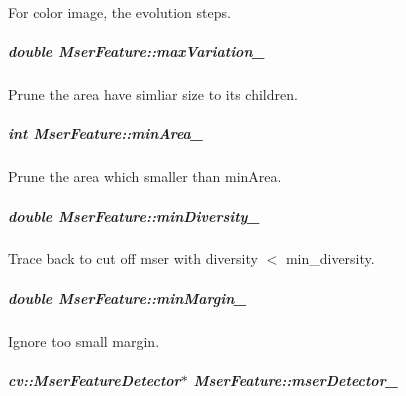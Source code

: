 For color image, the evolution steps. 

\hypertarget{group___feature_extractor_a9353f0657019b0177c8ce65c00d826f4}{
\subparagraph[{max\-Variation\-\_\-}]{\setlength{\rightskip}{0pt plus 5cm}double Mser\-Feature\-::max\-Variation\-\_\-\hspace{0.3cm}{\ttfamily [private]}}}\label{group___feature_extractor_a9353f0657019b0177c8ce65c00d826f4}


Prune the area have simliar size to its children. 

\hypertarget{group___feature_extractor_a556156bf90c6cff20f7451134dc5c9f3}{
\subparagraph[{min\-Area\-\_\-}]{\setlength{\rightskip}{0pt plus 5cm}int Mser\-Feature\-::min\-Area\-\_\-\hspace{0.3cm}{\ttfamily [private]}}}\label{group___feature_extractor_a556156bf90c6cff20f7451134dc5c9f3}


Prune the area which smaller than min\-Area. 

\hypertarget{group___feature_extractor_a7f7fe51c62b96bcc83f51e73e0d59a94}{
\subparagraph[{min\-Diversity\-\_\-}]{\setlength{\rightskip}{0pt plus 5cm}double Mser\-Feature\-::min\-Diversity\-\_\-\hspace{0.3cm}{\ttfamily [private]}}}\label{group___feature_extractor_a7f7fe51c62b96bcc83f51e73e0d59a94}


Trace back to cut off mser with diversity $<$ min\-\_\-diversity. 

\hypertarget{group___feature_extractor_a6bc22c26631b87ff8787244da9d1eca2}{
\subparagraph[{min\-Margin\-\_\-}]{\setlength{\rightskip}{0pt plus 5cm}double Mser\-Feature\-::min\-Margin\-\_\-\hspace{0.3cm}{\ttfamily [private]}}}\label{group___feature_extractor_a6bc22c26631b87ff8787244da9d1eca2}


Ignore too small margin. 

\hypertarget{group___feature_extractor_a4e7332139a72f3591cbc2e02e7f67748}{
\subparagraph[{mser\-Detector\-\_\-}]{\setlength{\rightskip}{0pt plus 5cm}cv\-::\-Mser\-Feature\-Detector$\ast$ Mser\-Feature\-::mser\-Detector\-\_\-\hspace{0.3cm}{\ttfamily [private]}}}\label{group___feature_extractor_a4e7332139a72f3591cbc2e02e7f67748}


